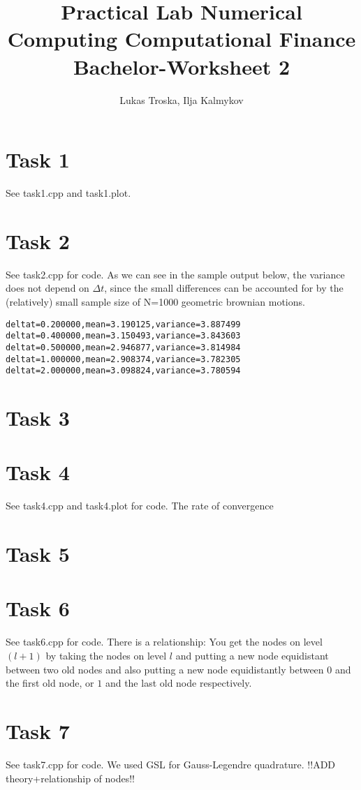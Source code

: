 \documentclass[]{article}
\title{Practical Lab Numerical Computing Computational Finance \\Bachelor-Worksheet 2}
\author{Lukas Troska, Ilja Kalmykov}
\date{}
\begin{document}
\maketitle
\section*{Task 1}
See task1.cpp and task1.plot.

\section*{Task 2}
See task2.cpp for code. As we can see in the sample output below, the variance does not depend on $\Delta t$, since the small differences can be accounted for by the (relatively) small sample size of N=1000 geometric brownian motions.
\begin{lstlisting}[frame=single] 
deltat=0.200000,mean=3.190125,variance=3.887499
deltat=0.400000,mean=3.150493,variance=3.843603
deltat=0.500000,mean=2.946877,variance=3.814984
deltat=1.000000,mean=2.908374,variance=3.782305
deltat=2.000000,mean=3.098824,variance=3.780594
\end{lstlisting}


\section*{Task 3}

\section*{Task 4}
See task4.cpp and task4.plot for code. The rate of convergence


\section*{Task 5}

\section*{Task 6}
See task6.cpp for code. There is a relationship: You get the nodes on level $(l+1)$ by taking the nodes on level $l$ and putting a new node equidistant between two old nodes and also putting a new node equidistantly between $0$ and the first old node, or $1$ and the last old node respectively.

\section*{Task 7}
See task7.cpp for code. We used GSL for Gauss-Legendre quadrature. !!ADD theory+relationship of nodes!!
\end{document}
